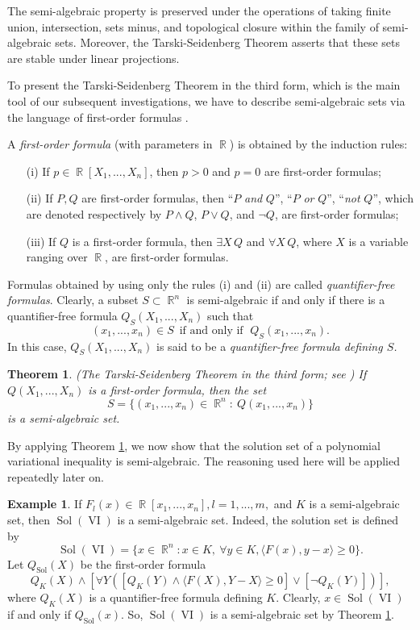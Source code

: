 \documentclass[]{interact}
\theoremstyle{plain}%
\newtheorem{theorem}{Theorem}[section]
\theoremstyle{definition}
\newtheorem{example}{Example}[section]
\DeclareMathOperator{\Sol}{Sol}
\DeclareMathOperator{\VI}{VI}
\DeclareMathOperator{\R}{\mathbb{R}}
\begin{document}
The semi-algebraic property is preserved under the operations of taking finite union, intersection, sets minus, and topological closure within the family of semi-algebraic sets. Moreover, the Tarski-Seidenberg Theorem asserts that these sets are stable under linear projections. 

To present the Tarski-Seidenberg Theorem in the third form, which is the main tool of our subsequent investigations, we have to describe semi-algebraic sets via the language of first-order formulas \cite{Coste02}. 

A \textit{first-order formula} (with parameters in $\R$) is
obtained by the induction rules:
\begin{enumerate}
	\item[(i)] If $p \in\R[X_1, . . . , X_n]$, then $p > 0$ and $p= 0$ are first-order formulas;
	\item[(ii)] If $P,Q$ are first-order formulas, then ``$P$ \textit{and} $Q$'', ``$P$ \textit{or} $Q$'', ``\textit{not} $Q$'', which are denoted respectively by $P \wedge Q$, $P \vee Q$, and $\neg Q$, are first-order formulas;
	\item[(iii)] If $Q$ is a first-order formula, then $\exists X\, Q$ and $\forall X\, Q$, where $X$ is a variable ranging over $\R$, are first-order formulas.
\end{enumerate}

Formulas obtained by using only the rules (i) and (ii) are called \textit{quantifier-free
	formulas}. Clearly,  a subset $S \subset \R^n$ is semi-algebraic if and only if there is a quantifier-free formula $Q_S(X_1,...,X_n)$ such that
$$(x_1,...,x_n) \in S\ \; \text{if and only if }\; Q_S(x_1,..., x_n).$$
In this case, $Q_S(X_1,...,X_n)$ is said to be a \textit{quantifier-free formula defining $S$.}

\begin{theorem}\label{Tar_Sei3} {\rm (The Tarski-Seidenberg Theorem in the third form; see \cite{Coste02})} If $Q(X_1,...,X_n)$ is a first-order formula, then the set $$S=\big\lbrace (x_1,...,x_n)\in\R^n: \ Q(x_1,...,x_n) \big\rbrace $$ is a semi-algebraic set. 
\end{theorem}

By applying Theorem \ref{Tar_Sei3}, we now show that the solution set of a polynomial variational inequality is  semi-algebraic. The reasoning used here will be applied repeatedly later on. 

\begin{example} \rm If $F_l(x) \in\R[x_1, . . . , x_n], l=1,...,m,$ and $K$ is a semi-algebraic set, then $\Sol(\VI)$ is a semi-algebraic set. Indeed, the solution set is defined by 
	$$\Sol(\VI)=\big\{x\in\R^n:x\in K,\ \forall y\in K,  \langle F(x),y-x\rangle\geq 0\big\}.$$
	Let $Q_{\Sol}(X)$ be the first-order formula
	$$Q_K(X) \wedge \left[\forall Y \left( \left[ Q_K(Y)\wedge \langle F(X),Y-X\rangle\geq 0\right]\vee \left[ \neg Q_K(Y)\right]\right)  \right],$$
	where $Q_K(X)$ is a quantifier-free formula defining $K$. Clearly, $x\in \Sol(\VI)$ if and only if $Q_{\Sol}(x)$. So, $\Sol(\VI)$ is a semi-algebraic set by Theorem \ref{Tar_Sei3}.
\end{example}
\end{document}
